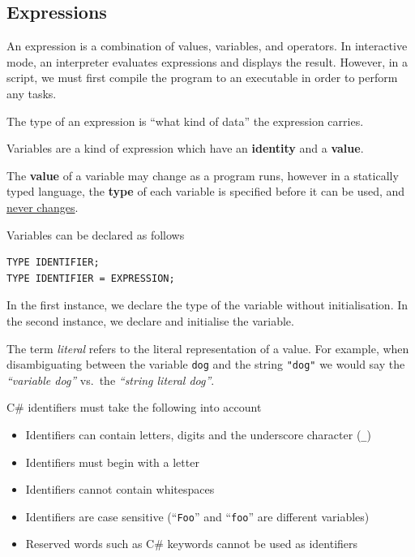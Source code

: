 \documentclass{article}
\begin{document}
\subsection{Expressions}
\begin{definition}[Expressions]
    An expression is a combination of values, variables, and operators.
    In interactive mode, an interpreter evaluates expressions and displays the result.
    However, in a script, we must first compile the program to an executable in order
    to perform any tasks.
\end{definition}
\begin{definition}[Type]
    The type of an expression is ``what kind of data'' the expression carries.
\end{definition}
\begin{definition}[Variables]
    Variables are a kind of expression which have an \textbf{identity} and a \textbf{value}.

    The \textbf{value} of a variable may change as a program runs, however in
    a statically typed language, the \textbf{type} of each variable is
    specified before it can be used, and \underline{never changes}.

    Variables can be declared as follows
    \begin{lstlisting}[numbers=none]
TYPE IDENTIFIER;
TYPE IDENTIFIER = EXPRESSION;\end{lstlisting}
    In the first instance, we declare the type of the variable without initialisation.
    In the second instance, we declare and initialise the variable.
\end{definition}
\begin{definition}[Literal]
    The term \textit{literal} refers to the literal representation of a value.
    For example, when disambiguating between the variable \lstinline{dog}
    and the string \lstinline{"dog"} we would say the \emph{``variable dog''} %
    vs.\ the \emph{``string literal dog''}.
\end{definition}
C\# identifiers must take the following into account
\begin{itemize}
    \item Identifiers can contain letters, digits and the underscore character (\lstinline{_})
    \item Identifiers must begin with a letter
    \item Identifiers cannot contain whitespaces
    \item Identifiers are case sensitive (``\lstinline{Foo}'' and ``\lstinline{foo}'' are different variables) %
    \item Reserved words such as C\# keywords cannot be used as identifiers
\end{itemize}
\end{document}
